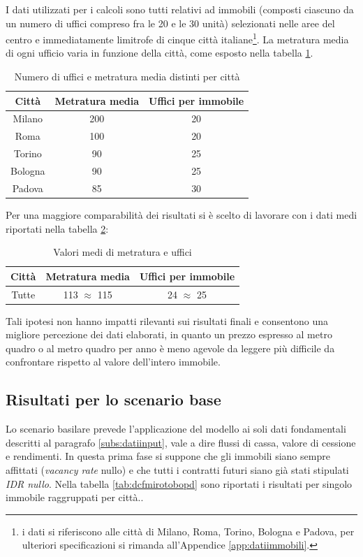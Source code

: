 I dati utilizzati per i calcoli sono tutti relativi ad immobili (composti ciascuno da un numero di uffici compreso fra le 20 e le 30 unità) selezionati nelle aree del centro e immediatamente limitrofe di cinque città italiane\footnote{i dati si riferiscono alle città di Milano, Roma, Torino, Bologna e Padova, per ulteriori specificazioni si rimanda all'Appendice \ref{app:datiimmobili}.}. La metratura media di ogni ufficio varia in funzione della città, come esposto nella tabella \ref{tab:metrature}.
\begin{table}[htbp]
\begin{center} \begin{tabular}{|c|c|c|}
\hline
{\bfseries Città} & {\bfseries Metratura media} & {\bfseries Uffici per immobile} \\
\hline
Milano & 200 & 20 \\
\hline
Roma & 100 & 20 \\
\hline
Torino & 90 & 25 \\
\hline
Bologna & 90 & 25 \\
\hline
Padova & 85 & 30\\
\hline
\end{tabular} \end{center}
\caption{Numero di uffici e metratura media distinti per città}
\label{tab:metrature}
\end{table}
Per una maggiore comparabilità dei risultati si è scelto di lavorare con i dati medi riportati nella tabella \ref{tab:metriufficimedi}:
\begin{table}[htbp]
\begin{center} \begin{tabular}{|c|c|c|}
\hline
{\bfseries Città} & {\bfseries Metratura media} & {\bfseries Uffici per immobile} \\
\hline
Tutte & 113 $\approx$ 115 & 24 $\approx$ 25 \\
\hline
\end{tabular} \end{center}
\caption{Valori medi di metratura e uffici}
\label{tab:metriufficimedi}
\end{table}
Tali ipotesi non hanno impatti rilevanti sui risultati finali e consentono una migliore percezione dei dati elaborati, in quanto un prezzo espresso al metro quadro o al metro quadro per anno è meno agevole da leggere più difficile da confrontare rispetto al valore dell'intero immobile.

\subsection{Risultati per lo scenario base}
\label{subs:risultatiscenbase}
Lo scenario basilare prevede l'applicazione del modello ai soli dati fondamentali descritti al paragrafo \ref{subs:datiinput}, vale a dire flussi di cassa, valore di cessione e rendimenti. In questa prima fase si suppone che gli immobili siano sempre affittati ({\itshape vacancy rate} nullo) e che tutti i contratti futuri siano già stati stipulati {\itshape IDR nullo}.
Nella tabella \ref{tab:dcfmirotobopd} sono riportati i risultati per singolo immobile raggruppati per città..

